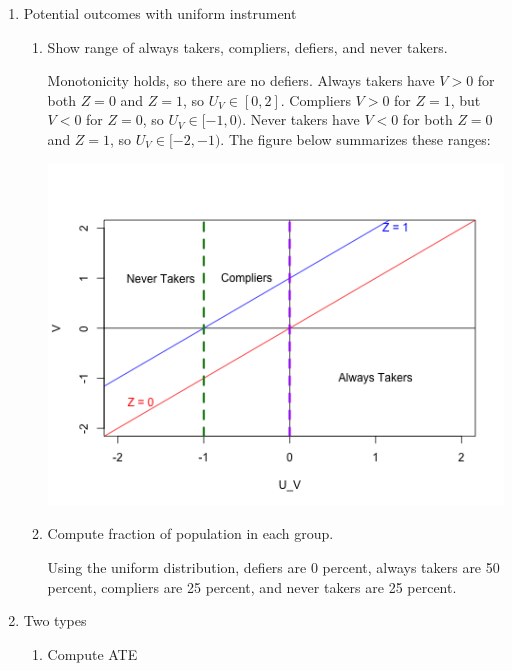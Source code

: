 \documentclass{article}
\begin{document}
\begin{enumerate}
\begin{enumerate}
\end{enumerate}

\item Potential outcomes with uniform instrument

\begin{enumerate}

\item Show range of always takers, compliers, defiers, and never takers.

Monotonicity holds, so there are no defiers. Always takers have $V > 0$ for both $Z = 0$ and $Z = 1$, so $U_V \in [0, 2]$. Compliers $V > 0$ for $Z = 1$, but $V < 0$ for $Z = 0$, so $U_V \in [-1, 0)$. Never takers have $V < 0$ for both $Z = 0$ and $Z =1$, so $U_V \in [-2, -1)$. The figure below summarizes these ranges:

\begin{center}
\includegraphics[scale = 0.8]{p1_q3_a}
\end{center}

\item Compute fraction of population in each group.

Using the uniform distribution, defiers are 0 percent, always takers are 50 percent, compliers are 25 percent, and never takers are 25 percent.

\end{enumerate}

\item Two types

\begin{enumerate}

\item Compute ATE


\end{enumerate}
\end{enumerate}
\end{document}
